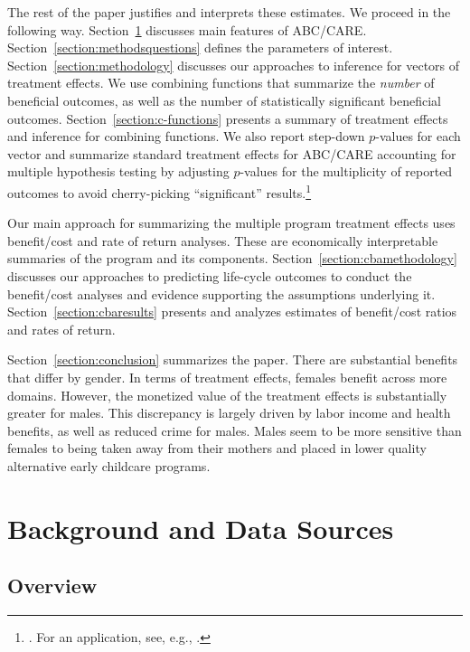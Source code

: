The rest of the paper justifies and interprets these estimates. We proceed in the following way. Section~\ref{section:background} discusses main features of ABC/CARE. Section~\ref{section:methodsquestions} defines the parameters of interest. Section~\ref{section:methodology} discusses our approaches to inference for vectors of treatment effects. We use combining functions that summarize the \emph{number} of beneficial outcomes, as well as the number of statistically significant beneficial outcomes. Section~\ref{section:c-functions} presents a summary of treatment effects and inference for combining functions. We also report step-down $p$-values for each vector and summarize standard treatment effects for ABC/CARE accounting for multiple hypothesis testing by adjusting $p$-values for the multiplicity of reported outcomes to avoid cherry-picking ``significant'' results.\footnote{\citet{Lehman_Romano_2005_AnnStat,Romano_Shaikh_2006_AnnStat}. For an application, see, e.g., \cite{Heckman_Moon_etal_2010_QE}.}

Our main approach for summarizing the multiple program treatment effects uses benefit/cost and rate of return analyses. These are economically interpretable summaries of the program and its components. Section~\ref{section:cbamethodology} discusses our approaches to predicting life-cycle outcomes to conduct the benefit/cost analyses and evidence supporting the assumptions underlying it. Section~\ref{section:cbaresults} presents and analyzes estimates of benefit/cost ratios and rates of return.

Section~\ref{section:conclusion} summarizes the paper. There are substantial benefits that differ by gender. In terms of treatment effects, females benefit across more domains. However, the monetized value of the treatment effects is substantially greater for males. This discrepancy is largely driven by labor income and health benefits, as well as reduced crime for males. Males seem to be more sensitive than females to being taken away from their mothers and placed in lower quality alternative early childcare programs.

\section[Background and Data Sources]{Background and Data Sources} \label{section:background}

\subsection{Overview}

